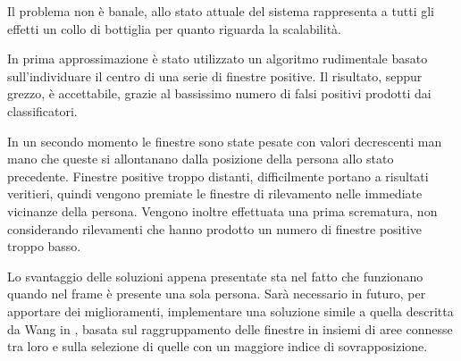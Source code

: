         Il problema non è banale, allo stato attuale del sistema rappresenta a tutti gli effetti un collo di bottiglia per quanto riguarda la scalabilità.
        
        In prima approssimazione è stato utilizzato un algoritmo rudimentale basato sull'individuare il centro di una serie di finestre positive.
        Il risultato, seppur grezzo, è accettabile, grazie al bassissimo numero di falsi positivi prodotti dai classificatori. 

        In un secondo momento le finestre sono state pesate con valori decrescenti man mano che queste si allontanano dalla posizione della persona allo stato precedente.
        Finestre positive troppo distanti, difficilmente portano a risultati veritieri, quindi vengono premiate le finestre di rilevamento nelle immediate vicinanze della persona.
        Vengono inoltre effettuata una prima scrematura, non considerando rilevamenti che hanno prodotto un numero di finestre positive troppo basso.

        Lo svantaggio delle soluzioni appena presentate sta nel fatto che funzionano quando nel frame è presente una sola persona.
        Sarà necessario in futuro, per apportare dei miglioramenti, implementare una soluzione simile a quella descritta da Wang in \cite{Wang14}, basata sul raggruppamento delle finestre in insiemi di aree connesse tra loro e sulla selezione di quelle con un maggiore indice di sovrapposizione. 
